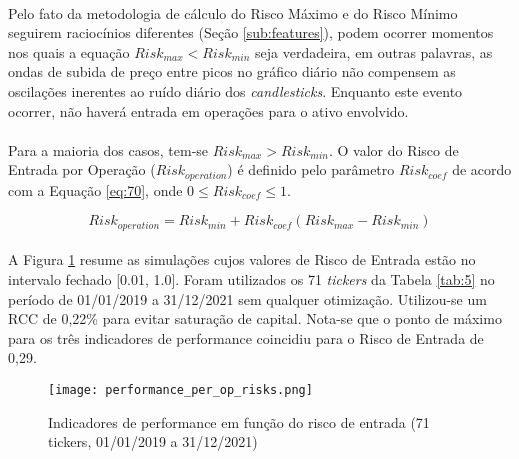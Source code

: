 \paragraph{} Pelo fato da metodologia de cálculo do Risco Máximo e do Risco Mínimo seguirem raciocínios diferentes (Seção \ref{sub:features}), podem ocorrer momentos nos quais a equação \begin{math} Risk_{max} < Risk_{min} \end{math} seja verdadeira, em outras palavras, as ondas de subida de preço entre picos no gráfico diário não compensem as oscilações inerentes ao ruído diário dos \textit{candlesticks}. Enquanto este evento ocorrer, não haverá entrada em operações para o ativo envolvido.

\paragraph{} Para a maioria dos casos, tem-se \begin{math} Risk_{max} > Risk_{min} \end{math}. O valor do Risco de Entrada por Operação (\begin{math} Risk_{operation} \end{math}) é definido pelo parâmetro \begin{math} Risk_{coef} \end{math} de acordo com a Equação \ref{eq:70}, onde \begin{math} 0 \le Risk_{coef} \le 1 \end{math}.

\begin{equation} \label{eq:70}
    Risk_{operation} = Risk_{min} + Risk_{coef}(Risk_{max} - Risk_{min})
\end{equation}

\paragraph{} A Figura \ref{fig:553} resume as simulações cujos valores de Risco de Entrada estão no intervalo fechado [0.01, 1.0]. Foram utilizados os 71 \textit{tickers} da Tabela \ref{tab:5} no período de 01/01/2019 a 31/12/2021 sem qualquer otimização. Utilizou-se um RCC de 0,22\% para evitar saturação de capital. Nota-se que o ponto de máximo para os três indicadores de performance coincidiu para o Risco de Entrada de 0,29.

\begin{figure}[!htb]
    \texttt{[image: performance\_per\_op\_risks.png]}
    \centering
    \caption{Indicadores de performance em função do risco de entrada (71 tickers, 01/01/2019 a 31/12/2021)}
    \label{fig:553}
\end{figure}



